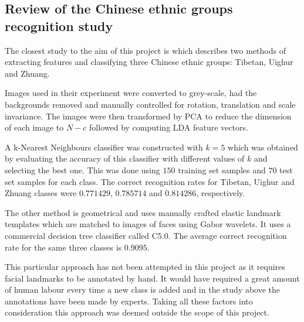 \subsection{Review of the Chinese ethnic groups recognition study}
The closest study to the aim of this project is \citep{chinesegroups} which
describes two methods of extracting features and classifying three Chinese
ethnic groups: Tibetan, Uighur and Zhuang.

Images used in their experiment were converted to grey-scale, had the
backgrounds removed and manually controlled for rotation, translation and scale
invariance. The images were then transformed by PCA to reduce the dimension of
each image to $N-c$ followed by computing LDA feature vectors.

A k-Nearest Neighbours classifier was constructed with $k=5$ which was obtained
by evaluating the accuracy of this classifier with different values of $k$ and
selecting the best one. This was done using $150$ training set samples and $70$
test set samples for each class. The correct recognition rates for Tibetan,
Uighur and Zhuang classes were $0.771429$, $0.785714$ and $0.814286$,
respectively.

The other method is geometrical and uses manually crafted elastic landmark
templates which are matched to images of faces using Gabor wavelets. It uses a
commercial decision tree classifier called C5.0. The average correct
recognition rate for the same three classes is $0.9095$.

This particular approach has not been attempted in this project as it requires
facial landmarks to be annotated by hand. It would have required a great amount
of human labour every time a new class is added and in the study above the
annotations have been made by experts. Taking all these factors into
consideration this approach was deemed outside the scope of this project.


